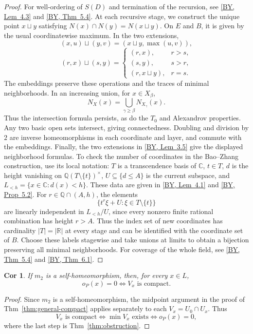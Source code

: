 \documentclass[10pt,letterpaper]{amsart}
\numberwithin{equation}{section}
\newtheorem{cor}[thm]{Cor}
\theoremstyle{definition}
\newcommand{\Q}{\mathbb Q}
\newcommand{\C}{\mathbb C}
\newcommand{\byref}[2]{\href{https://arxiv.org/pdf/2610.38300v1\#page=#1}{[BY, #2]}}
\begin{document}
\begin{proof}
For well-ordering of $S(D)$ and termination of the recursion, see \byref{12}{Lem~4.3} and \byref{16}{Thm~5.4}.
At each recursive stage, we construct the unique point $x\sqcup y$ satisfying $N(x)\cap N(y)=N(x\sqcup y)$. On $E$ and $B$, it is given by the usual coordinatewise maximum. In the two extensions,
\[
(x,u)\sqcup(y,v)=(x\sqcup y,\max(u,v)),
\]
\[
(r,x)\sqcup(s,y)=
\begin{cases}
(r,x),&r>s,\\
(s,y),&s>r,\\
(r,x\sqcup y),&r=s.
\end{cases}
\]
The embeddings preserve these operations and the traces of minimal neighborhoods. In an increasing union, for $x\in X_\beta$,
\[
N_X(x)=\bigcup_{\gamma\ge\beta}N_{X_\gamma}(x).
\]
Thus the intersection formula persists, as do the $T_0$ and Alexandrov properties. Any two basic open sets intersect, giving connectedness. Doubling and division by $2$ are inverse homeomorphisms in each coordinate and layer, and commute with the embeddings.
Finally, the two extensions in \byref{9}{Lem~3.5} give the displayed neighborhood formulas. To check the number of coordinates in the Bao--Zhang construction, use its local notation: $T$ is a transcendence basis of $\C$, $t\in T$, $d$ is the height vanishing on $\Q(T\setminus\{t\})^\times$, $U\subseteq\{d\le A\}$ is the current subspace, and $L_{<h}=\{x\in\C:d(x)<h\}$. These data are given in \byref{10}{Lem~4.1} and \byref{14}{Prop~5.2}. For $r\in\Q\cap(A,h)$, the elements
\[
\{t^r\xi+U:\xi\in T\setminus\{t\}\}
\]
are linearly independent in $L_{<h}/U$, since every nonzero finite rational combination has height $r>A$. Thus the index set of new coordinates has cardinality $|T|=|\mathbb R|$ at every stage and can be identified with the coordinate set of $B$. Choose these labels stagewise and take unions at limits to obtain a bijection preserving all minimal neighborhoods. For coverage of the whole field, see \byref{16}{Thm~5.4} and \byref{18}{Thm~6.1}.
\end{proof}

\begin{cor}\label{cor:topological-obstruction}
If $m_2$ is a self-homeomorphism, then, for every $x\in L$,
\[
o_P(x)=0\iff V_x\text{ is compact}.
\]
\end{cor}
\begin{proof}
Since $m_2$ is a self-homeomorphism, the midpoint argument in the proof of Thm~\ref{thm:general-compact} applies separately to each $V_x=U_0\cap U_x$. Thus
\[
V_x\text{ is compact}\iff\min V_x\text{ exists}\iff o_P(x)=0,
\]
where the last step is Thm~\ref{thm:obstruction}.
\end{proof}
\end{document}
